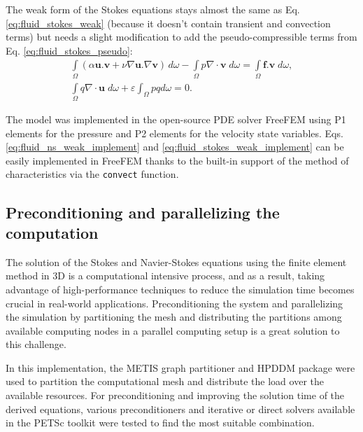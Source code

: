 The weak form of the Stokes equations stays almost the same as Eq. \ref{eq:fluid_stokes_weak} (because it doesn't contain transient and convection terms) but needs a slight modification to add the pseudo-compressible terms from Eq. \ref{eq:fluid_stokes_pseudo}:
\begin{equation} \label{eq:fluid_stokes_weak_implement}
\begin{array}{*{20}{l}}
\displaystyle  {\int\limits_\Omega  {(\alpha {\mathbf{u}}.{\mathbf{v}} + \nu\nabla {\mathbf{u}}.\nabla {\mathbf{v}})\,} d\omega  - \int\limits_\Omega  {p\nabla\cdot{\mathbf{v}}\;d\omega  = } \int\limits_\Omega  {{\mathbf{f}}.{\mathbf{v}}\;d\omega,} } \\
\displaystyle  {\int\limits_\Omega  {q\nabla\cdot{\mathbf{u}}\;d\omega +\varepsilon \int_{\Omega} p q d \omega  = 0}.}
\end{array}
\end{equation}

The model was implemented in the open-source PDE solver FreeFEM \cite{Hecht2012} using P1 elements for the pressure and P2 elements for the velocity state variables. Eqs. \ref{eq:fluid_ns_weak_implement} and \ref{eq:fluid_stokes_weak_implement} can be easily implemented in FreeFEM thanks to the built-in support of the method of characteristics via the \verb|convect| function.


\subsection{Preconditioning and parallelizing the computation}

The solution of the Stokes and Navier-Stokes equations using the finite element method in 3D is a computational intensive process, and as a result, taking advantage of high-performance techniques to reduce the simulation time becomes crucial in real-world applications. Preconditioning the system and parallelizing the simulation by partitioning the mesh and distributing the partitions among available computing nodes in a parallel computing setup is a great solution to this challenge.

In this implementation, the METIS \cite{METIS1998} graph partitioner and HPDDM package \cite{Jolivet2013} were used to partition the computational mesh and distribute the load over the available resources. For preconditioning and improving the solution time of the derived equations, various preconditioners and iterative or direct solvers available in the PETSc toolkit \cite{petsc} were tested to find the most suitable combination.

